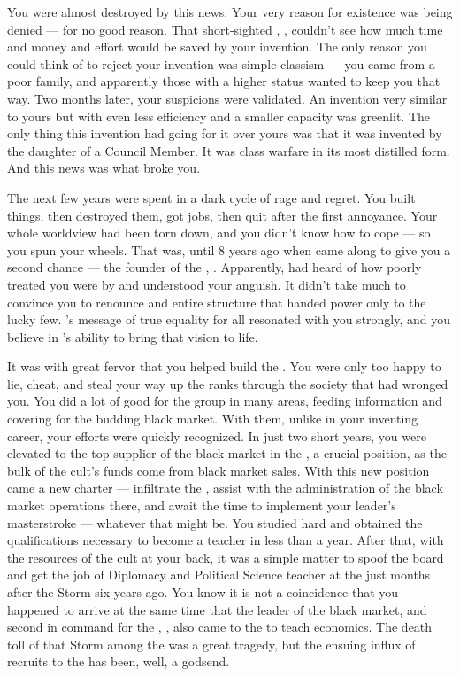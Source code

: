 \documentclass[char]{GL2020}
\begin{document}
You were almost destroyed by this news. Your very reason for existence was being denied — for no good reason. That short-sighted \cAntiChup{\cleric}, \cAntiChup{\full}, couldn't see how much time and money and effort would be saved by your invention. The only reason you could think of to reject your invention was simple classism — you came from a poor family, and apparently those with a higher status wanted to keep you that way. Two months later, your suspicions were validated. An invention very similar to yours but with even less efficiency and a smaller capacity was greenlit. The only thing this invention had going for it over yours was that it was invented by the daughter of a Council Member. It was class warfare in its most distilled form. And this news was what broke you.

The next few years were spent in a dark cycle of rage and regret. You built things, then destroyed them, got jobs, then quit after the first annoyance. Your whole worldview had been torn down, and you didn't know how to cope — so you spun your wheels. That was, until 8 years ago when \emph{\cChupLeader{\they}} came along to give you a second chance — the founder of the \pGoaties{}, \cChupLeader{\full}. Apparently, \cChupLeader{} had heard of how poorly treated you were by \cTechGod{} and understood your anguish. It didn't take much to convince you to renounce \cTechGod{} and \cTechGod{\their} entire structure that handed power only to the lucky few. \cGenesis{}'s message of true equality for all resonated with you strongly, and you believe in \cChupLeader{}'s ability to bring that vision to life.

It was with great fervor that you helped build the \pGoaties{}. You were only too happy to lie, cheat, and steal your way up the ranks through the society that had wronged you. You did a lot of good for the group in many areas, feeding information and covering for the budding black market. With them, unlike in your inventing career, your efforts were quickly recognized. In just two short years, you were elevated to the top supplier of the black market in the \pTech{}, a crucial position, as the bulk of the cult’s funds come from black market sales. With this new position came a new charter — infiltrate the \pSchool{}, assist with the administration of the black market operations there, and await the time to implement your leader's masterstroke — whatever that might be. You studied hard and obtained the qualifications necessary to become a teacher in less than a year. After that, with the resources of the cult at your back, it was a simple matter to spoof the board and get the job of Diplomacy and Political Science teacher at the \pSc{} just months after the Storm six years ago. You know it is not a coincidence that you happened to arrive at the same time that the leader of the black market, and second in command for the \pGoaties{}, \cChupSecond{\full}, also came to the \pSc{} to teach economics. The death toll of that Storm among the \pShip{} was a great tragedy, but the ensuing influx of recruits to the \pGoaties{} has been, well, a godsend.
\end{document}
